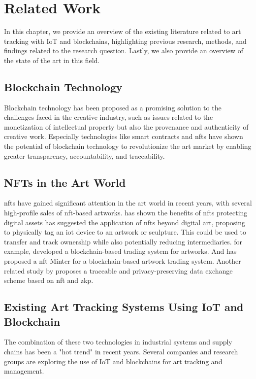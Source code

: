 \chapter{Related Work}
In this chapter, we provide an overview of the existing literature related to art tracking with IoT and blockchains, highlighting previous research, methods, and findings related to the research question. Lastly, we also provide an overview of the state of the art in this field.

\section{Blockchain Technology}
Blockchain technology has been proposed as a promising solution to the challenges faced in the creative industry, such as issues related to the monetization of intellectual property but also the provenance and authenticity of creative work. \cite{creativeindustry} Especially technologies like smart contracts and \glspl{nft} have shown the potential of blockchain technology to revolutionize the art market by enabling greater transparency, accountability, and traceability. 

\section{NFTs in the Art World}
 \glspl{nft} have gained significant attention in the art world in recent years, with several high-profile sales of \gls{nft}-based artworks. \textcite{nftopportunities} has shown the benefits of \glspl{nft} protecting digital assets \textcite{creativeindustry} has suggested the application of \glspl{nft} beyond digital art, proposing to physically tag an \gls{iot} device to an artwork or sculpture. This could be used to transfer and track ownership while also potentially reducing intermediaries. \textcite{artchain} for example, developed a blockchain-based trading system for artworks. And \textcite{nftminter} has proposed a \gls{nft} Minter for a blockchain-based artwork trading system. Another related study by \textcite{zkdet} proposes a traceable and privacy-preserving data exchange scheme based on \gls{nft} and \gls{zkp}.

\section{Existing Art Tracking Systems Using IoT and Blockchain}
The combination of these two technologies in industrial systems and supply chains has been a "hot trend" in recent years. \cite{industryiot} Several companies and research groups are exploring the use of IoT and blockchains for art tracking and management.

